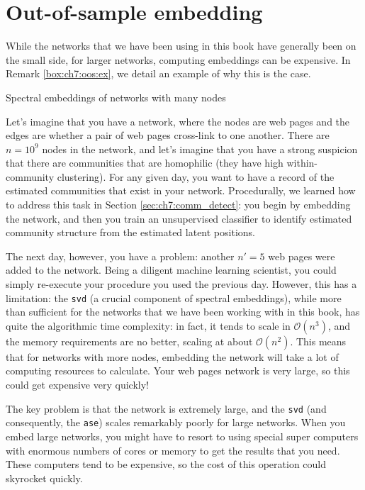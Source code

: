 \section{Out-of-sample embedding}
\label{sec:ch7:oos}

While the networks that we have been using in this book have generally been on the small side, for larger networks, computing embeddings can be expensive. In Remark \ref{box:ch7:oos:ex}, we detail an example of why this is the case.

\begin{floatingbox}[h]\caption{Spectral embeddings of networks with many nodes}
\label{box:ch7:oos:ex}
Let's imagine that you have a network, where the nodes are web pages and the edges are whether a pair of web pages cross-link to one another. There are $n=10^9$ nodes in the network, and let's imagine that you have a strong suspicion that there are communities that are homophilic (they have high within-community clustering). For any given day, you want to have a record of the estimated communities that exist in your network. Procedurally, we learned how to address this task in Section \ref{sec:ch7:comm_detect}: you begin by embedding the network, and then you train an unsupervised classifier to identify estimated community structure from the estimated latent positions.

The next day, however, you have a problem: another $n'=5$ web pages were added to the network. Being a diligent machine learning scientist, you could simply re-execute your procedure you used the previous day. However, this has a limitation: the \texttt{svd} (a crucial component of spectral embeddings), while more than sufficient for the networks that we have been working with in this book, has quite the algorithmic time complexity: in fact, it tends to scale in $\mathcal O(n^3)$, and the memory requirements are no better, scaling at about $\mathcal O(n^2)$. This means that for networks with more nodes, embedding the network will take a lot of computing resources to calculate. Your web pages network is very large, so this could get expensive very quickly!
\end{floatingbox}

The key problem is that the network is extremely large, and the \texttt{svd} (and consequently, the \texttt{ase}) scales remarkably poorly for large networks. When you embed large networks, you might have to resort to using special super computers with enormous numbers of cores or memory to get the results that you need. These computers tend to be expensive, so the cost of this operation could skyrocket quickly. 

